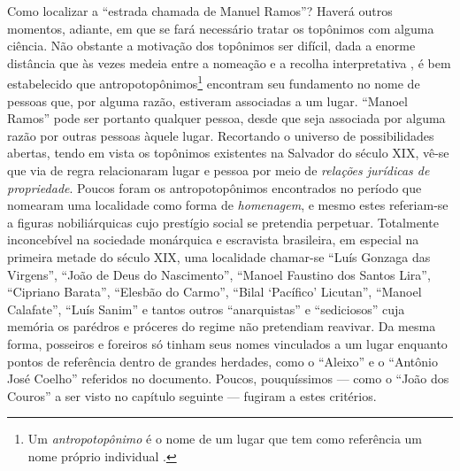 Como localizar a ``estrada chamada de Manuel Ramos''? Haverá outros momentos, adiante, em que se fará necessário tratar os topônimos com alguma ciência. Não obstante a motivação dos topônimos ser difícil, dada a enorme distância que às vezes medeia entre a nomeação e a recolha interpretativa \cite{aguilera_taxiproblema_1999}, é bem estabelecido que  antropotopônimos\footnote{Um \textit{antropotopônimo} é o nome de um lugar que tem como referência um nome próprio individual \cite{dick_taxotopo_1975, silva_eletopon_2017}.} encontram seu fundamento no nome de pessoas que, por alguma razão, estiveram associadas a um lugar. ``Manoel Ramos'' pode ser portanto qualquer pessoa, desde que seja associada por alguma razão por outras pessoas àquele lugar. Recortando o universo de possibilidades abertas, tendo em vista os topônimos existentes na Salvador do século XIX, vê-se que via de regra relacionaram lugar e pessoa por meio de \textit{relações jurídicas de propriedade}. Poucos foram os antropotopônimos encontrados no período que nomearam uma localidade como forma de \textit{homenagem}, e mesmo estes referiam-se a figuras nobiliárquicas cujo prestígio social se pretendia perpetuar. Totalmente inconcebível na sociedade monárquica e escravista brasileira, em especial na primeira metade do século XIX, uma localidade chamar-se ``Luís Gonzaga das Virgens'', ``João de Deus do Nascimento'', ``Manoel Faustino dos Santos Lira'', ``Cipriano Barata'', ``Elesbão do Carmo'', ``Bilal `Pacífico' Licutan'', ``Manoel Calafate'', ``Luís Sanim'' e tantos outros ``anarquistas'' e ``sediciosos'' cuja memória os parédros e próceres do regime não pretendiam reavivar. Da mesma forma, posseiros e foreiros só tinham seus nomes vinculados a um lugar enquanto pontos de referência dentro de grandes herdades, como o ``Aleixo'' e o ``Antônio José Coelho'' referidos no documento. Poucos, pouquíssimos --- como o ``João dos Couros'' a ser visto no capítulo seguinte --- fugiram a estes critérios. 

